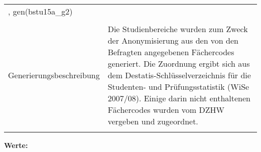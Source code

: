 \begin{tabular}{lL{11.3cm}}
, gen(bstu15a\_g2) \\
				 \\
					Generierungsbeschreibung & Die Studienbereiche wurden zum Zweck der Anonymisierung aus den von den Befragten angegebenen Fächercodes generiert. Die Zuordnung ergibt sich aus dem Destatis-Schlüsselverzeichnis für die Studenten- und Prüfungsstatistik (WiSe 2007/08). Einige darin nicht enthaltenen Fächercodes wurden vom DZHW vergeben und zugeordnet. 
				 \\	
			 \\
		\end{tabular}






			\vspace*{1 cm}
			\noindent\textbf{Werte:}\\
